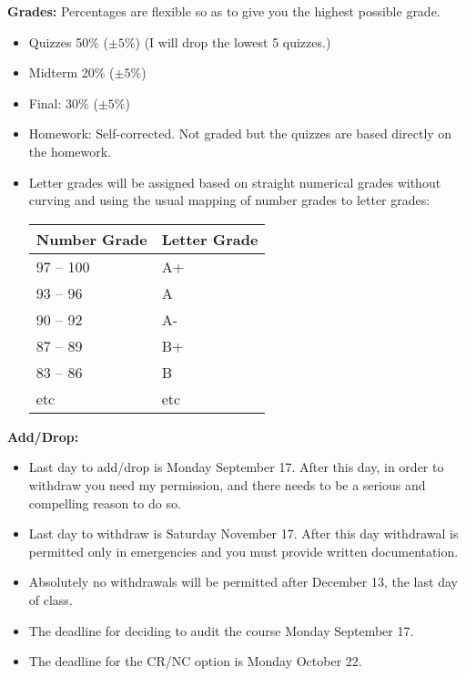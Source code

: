 \documentclass[oneside,12pt]{amsart}
\begin{document}
\textbf{Grades:} Percentages are flexible so as to give you the highest possible grade.
\begin{itemize}
\item Quizzes 50\% ($\pm5\%$) (I will drop the lowest 5 quizzes.)
\item Midterm 20\% ($\pm5\%$)
\item Final: 30\% ($\pm5\%$)
\item Homework: Self-corrected. Not graded but the quizzes are based directly on the homework.
\item Letter grades will be assigned based on straight numerical grades
without curving and using the usual mapping of number grades to letter grades:

\begin{center}
  \begin{tabular}{ | l | l |}
    \hline
    Number Grade & Letter Grade  \\ \hline \hline
    97 -- 100 & A+  \\ \hline
    93 -- 96 & A\\ \hline
    90 -- 92 & A- \\ \hline
    87 -- 89 & B+ \\ \hline
    83 -- 86 & B \\ \hline
    etc & etc \\ \hline
  \end{tabular}
\end{center}

\end{itemize}

\textbf{Add/Drop:}
\begin{itemize}
\item Last day to add/drop is Monday September 17. After this day, in order to withdraw you need my permission, and there needs to be a serious and compelling reason to do so.
\item Last day to withdraw is Saturday November 17. After this day withdrawal is permitted only in emergencies and you must provide written documentation.
\item Absolutely  no withdrawals will be permitted after December 13, the last day of class.
\item  The deadline for deciding to audit the course Monday September 17.
\item The deadline for the CR/NC option is Monday October 22.
\end{itemize}
\end{document}
